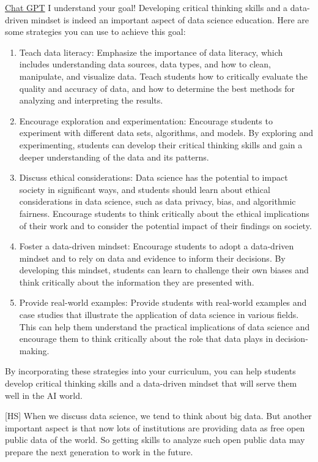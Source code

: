 \documentclass[
]{bxjsbook}
\providecommand{\tightlist}{%
  \setlength{\itemsep}{0pt}\setlength{\parskip}{0pt}}
\theoremstyle{definition}
\theoremstyle{definition}
\theoremstyle{definition}
\theoremstyle{definition}
\theoremstyle{remark}
\begin{document}
\protect\hyperlink{chatgpt}{Chat GPT} I understand your goal! Developing critical thinking skills and a data-driven mindset is indeed an important aspect of data science education. Here are some strategies you can use to achieve this goal:

\begin{enumerate}
\def\labelenumi{\arabic{enumi}.}
\tightlist
\item
  Teach data literacy: Emphasize the importance of data literacy, which includes understanding data sources, data types, and how to clean, manipulate, and visualize data. Teach students how to critically evaluate the quality and accuracy of data, and how to determine the best methods for analyzing and interpreting the results.
\item
  Encourage exploration and experimentation: Encourage students to experiment with different data sets, algorithms, and models. By exploring and experimenting, students can develop their critical thinking skills and gain a deeper understanding of the data and its patterns.
\item
  Discuss ethical considerations: Data science has the potential to impact society in significant ways, and students should learn about ethical considerations in data science, such as data privacy, bias, and algorithmic fairness. Encourage students to think critically about the ethical implications of their work and to consider the potential impact of their findings on society.
\item
  Foster a data-driven mindset: Encourage students to adopt a data-driven mindset and to rely on data and evidence to inform their decisions. By developing this mindset, students can learn to challenge their own biases and think critically about the information they are presented with.
\item
  Provide real-world examples: Provide students with real-world examples and case studies that illustrate the application of data science in various fields. This can help them understand the practical implications of data science and encourage them to think critically about the role that data plays in decision-making.
\end{enumerate}

By incorporating these strategies into your curriculum, you can help students develop critical thinking skills and a data-driven mindset that will serve them well in the AI world.

{[}HS{]} When we discuss data science, we tend to think about big data. But another important aspect is that now lots of institutions are providing data as free open public data of the world. So getting skills to analyze such open public data may prepare the next generation to work in the future.
\end{document}
